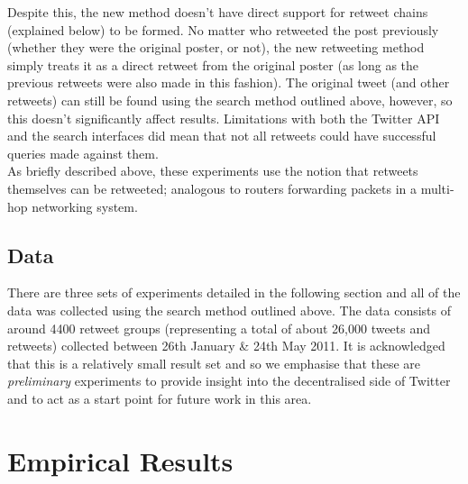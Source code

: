 Despite this, the new method doesn't have direct support for retweet chains (explained below) to be formed. No matter who retweeted the post previously (whether they were the original poster, or not), the new retweeting method simply treats it as a direct retweet from the original poster (as long as the previous retweets were also made in this fashion). The original tweet (and other retweets) can still be found using the search method outlined above, however, so this doesn't significantly affect results. Limitations with both the Twitter API and the search interfaces did mean that not all retweets could have successful queries made against them.\\
As briefly described above, these experiments use the notion that retweets themselves can be retweeted; analogous to routers forwarding packets in a multi-hop networking system.\\


\subsection{Data}
There are three sets of experiments detailed in the following section and all of the data was collected using the search method outlined above. The data consists of around 4400 retweet groups (representing a total of about 26,000 tweets and retweets) collected between 26th January \& 24th May 2011. It is acknowledged that this is a relatively small result set and so we emphasise that these are \textit{preliminary} experiments to provide insight into the decentralised side of Twitter and to act as a start point for future work in this area.\\

\section{Empirical Results}

